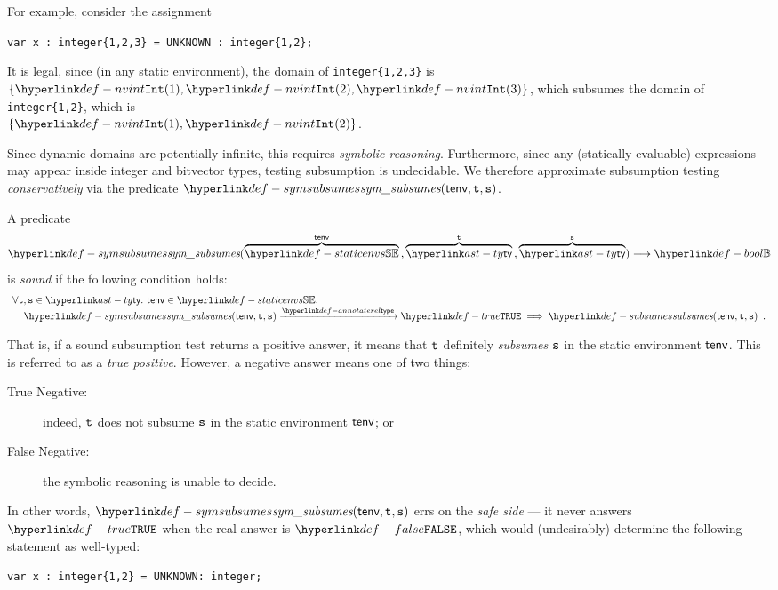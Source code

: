 For example, consider the assignment
\begin{center}
\verb|var x : integer{1,2,3} = UNKNOWN : integer{1,2};|
\end{center}

It is legal, since (in any static environment), the domain of \verb|integer{1,2,3}|
is \\
$\{\nvint(1), \nvint(2), \nvint(3)\}$, which subsumes
the domain of \verb|integer{1,2}|, which is \\ $\{\nvint(1), \nvint(2)\}$.

Since dynamic domains are potentially infinite, this requires \emph{symbolic reasoning}.
Furthermore, since any (statically evaluable) expressions may appear inside integer and bitvector
types, testing subsumption is undecidable.
We therefore approximate subsumption testing \emph{conservatively} via the predicate $\symsubsumes(\tenv, \vt, \vs)$.

\hypertarget{def-soundsubsumptiontest}{}
\begin{definition}
A predicate
\[
  \symsubsumes(\overname{\staticenvs}{\tenv} \aslsep \overname{\ty}{\vt} \aslsep \overname{\ty}{\vs}) \aslto \Bool
\]
is \emph{sound} if the following condition holds:
\begin{equation}
  \begin{array}{l}
  \forall \vt,\vs\in\ty.\ \tenv\in\staticenvs. \\
  \;\;\;\; \symsubsumes(\tenv, \vt, \vs) \typearrow \True \;\Longrightarrow\; \subsumes(\tenv, \vt, \vs)  \enspace.
  \end{array}
\end{equation}
\end{definition}

That is, if a sound subsumption test returns a positive answer, it means that
$\texttt{t}$ definitely \emph{subsumes} $\texttt{s}$ in the static environment $\textsf{tenv}$.
This is referred to as a \emph{true positive}.
However, a negative answer means one of two things:
\begin{description}
  \item[True Negative:] indeed, $\texttt{t}$ does not subsume $\texttt{s}$ in the static environment $\textsf{tenv}$; or
  \item[False Negative:] the symbolic reasoning is unable to decide.
\end{description}

In other words, $\symsubsumes(\tenv, \vt, \vs)$ errs on the \emph{safe side} ---
it never answers $\True$ when the real answer is $\False$, which would (undesirably)
determine the following statement as well-typed:
\begin{center}
  \verb|var x : integer{1,2} = UNKNOWN: integer;|
\end{center}

